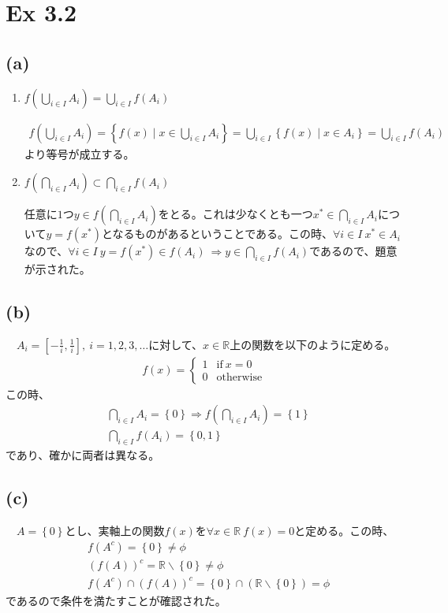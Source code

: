 \documentclass{article}
\begin{document}
\section{Ex 3.2}
\subsection{(a)}
\begin{enumerate}
	\item $f\left( \bigcup_{i \in I} A_i \right) = \bigcup_{i\in I} f\left( A_i \right)$
	
	\begin{align*}
		f\left( \bigcup_{i \in I} A_i \right) = \left\{ f(x)\mid x \in \bigcup_{i \in I } A_i \right\} = \bigcup_{i\in I} \left\{ f(x)\mid x \in A_i \right\} = \bigcup_{i\in I} f\left( A_i \right)
	\end{align*}
	より等号が成立する。
	
	\item $f\left( \bigcap_{i \in I} A_i \right) \subset \bigcap_{i\in I} f\left( A_i \right)$
	
	任意に$1$つ$y \in f\left( \bigcap_{i \in I} A_i \right)$をとる。これは少なくとも一つ$x^* \in \bigcap_{i \in I} A_i$について$y = f(x^*)$となるものがあるということである。この時、$\forall i \in I\ x^* \in A_i$なので、$\forall i\in I\ y = f(x^*)\in f\left( A_i \right)\ \Rightarrow y \in \bigcap_{i \in I} f\left( A_i \right)$であるので、題意が示された。
\end{enumerate}

\subsection{(b)}
　$A_i = \left[ -\frac{1}{i}, \frac{1}{i} \right],\ i = 1,2,3,\dots$に対して、$x \in \mathbb{R}$上の関数を以下のように定める。
\begin{align*}
	f(x) = \begin{cases}
	1 & \text{if}\ x = 0 \\
	0 & \text{otherwise}
	\end{cases}
\end{align*}
この時、
\begin{align*}
	&\bigcap_{i\in I} A_i = \left\{ 0 \right\} \Rightarrow f\left( \bigcap_{i\in I} A_i \right) = \left\{ 1 \right\} \\
	&\bigcap_{i \in I} f\left( A_i \right) = \left\{ 0,1 \right\}
\end{align*}
であり、確かに両者は異なる。

\subsection{(c)}
　$A = \left\{ 0 \right\}$とし、実軸上の関数$f(x)$を$\forall x \in \mathbb{R}\ f(x) = 0$と定める。この時、
\begin{align*}
	&f\left( A^c \right) = \left\{ 0\right\} \neq \phi\\
	&\left( f\left( A \right) \right)^c = \mathbb{R}\backslash \left\{ 0 \right\} \neq \phi\\
	&f\left( A^c \right) \cap \left( f\left( A \right) \right)^c = \left\{ 0\right\} \cap \left( \mathbb{R}\backslash \left\{ 0 \right\}\right) = \phi
\end{align*}
であるので条件を満たすことが確認された。
\end{document}
